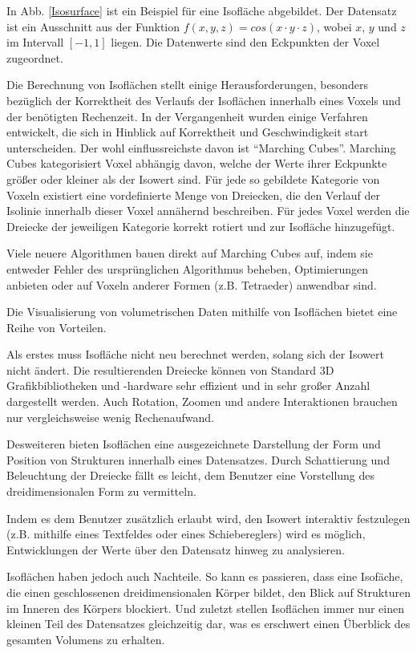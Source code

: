 \documentclass[a4paper,fontsize=12pt,toc=bib,halfparskip]{scrartcl}
\begin{document}
In Abb. \ref{Isosurface} ist ein Beispiel f\"ur eine Isofl\"ache abgebildet. Der Datensatz ist ein Ausschnitt aus der Funktion $f(x,y,z) = cos(x \cdot y \cdot z)$, wobei $x$, $y$ und $z$ im Intervall $[-1,1]$ liegen. Die Datenwerte sind den Eckpunkten der Voxel zugeordnet. 

Die Berechnung von Isofl\"achen stellt einige Herausforderungen, besonders bez\"uglich der Korrektheit des Verlaufs der Isofl\"achen innerhalb eines Voxels und der ben\"otigten Rechenzeit. In der Vergangenheit wurden einige Verfahren entwickelt, die sich in Hinblick auf Korrektheit und Geschwindigkeit start unterscheiden. Der wohl einflussreichste davon ist ``Marching Cubes''. Marching Cubes kategorisiert Voxel abh\"angig davon, welche der Werte ihrer Eckpunkte gr\"o{\ss}er oder kleiner als der Isowert sind. F\"ur jede so gebildete Kategorie von Voxeln existiert eine vordefinierte Menge von Dreiecken, die den Verlauf der Isolinie innerhalb dieser Voxel ann\"ahernd beschreiben. F\"ur jedes Voxel werden die Dreiecke der jeweiligen Kategorie korrekt rotiert und zur Isofl\"ache hinzugef\"ugt.

Viele neuere Algorithmen bauen direkt auf Marching Cubes auf, indem sie entweder Fehler des urspr\"unglichen Algorithmus beheben, Optimierungen anbieten oder auf Voxeln anderer Formen (z.B. Tetraeder) anwendbar sind.

Die Visualisierung von volumetrischen Daten mithilfe von Isofl\"achen bietet eine Reihe von Vorteilen. 

Als erstes muss Isofl\"ache nicht neu berechnet werden, solang sich der Isowert nicht \"andert. Die resultierenden Dreiecke k\"onnen von Standard 3D Grafikbibliotheken und -hardware sehr effizient und in sehr gro{\ss}er Anzahl dargestellt werden. Auch Rotation, Zoomen und andere Interaktionen brauchen nur vergleichsweise wenig Rechenaufwand.

Desweiteren bieten Isofl\"achen eine ausgezeichnete Darstellung der Form und Position von Strukturen innerhalb eines Datensatzes. Durch Schattierung und Beleuchtung der Dreiecke f\"allt es leicht, dem Benutzer eine Vorstellung des dreidimensionalen Form zu vermitteln.

Indem es dem Benutzer zus\"atzlich erlaubt wird, den Isowert interaktiv festzulegen (z.B. mithilfe eines Textfeldes oder eines Schiebereglers) wird es m\"oglich, Entwicklungen der Werte \"uber den Datensatz hinweg zu analysieren.

Isofl\"achen haben jedoch auch Nachteile. So kann es passieren, dass eine Isof\"ache, die einen geschlossenen dreidimensionalen K\"orper bildet, den Blick auf Strukturen im Inneren des K\"orpers blockiert. Und zuletzt stellen Isofl\"achen immer nur einen kleinen Teil des Datensatzes gleichzeitig dar, was es erschwert einen \"Uberblick des gesamten Volumens zu erhalten.
\end{document}
